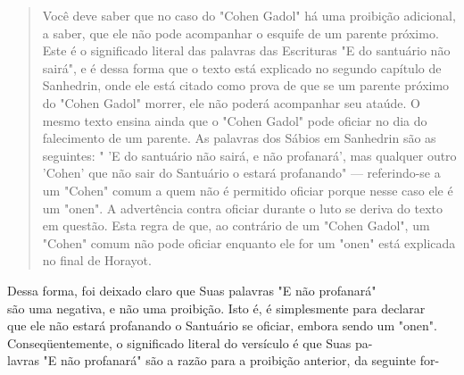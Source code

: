 \begin{quote}
Você deve saber que no caso do "Cohen Gadol" há uma proibição adicional,
a saber, que ele não pode acompanhar o esquife de um parente pró­ximo.
Este é o significado literal das palavras das Escrituras "E do santuário
não sairá", e é dessa forma que o texto está explicado no segundo
capítulo de Sa­nhedrin, onde ele está citado como prova de que se um
parente próximo do "Cohen Gadol" morrer, ele não poderá acompanhar seu
ataúde. O mesmo tex­to ensina ainda que o "Cohen Gadol" pode oficiar no
dia do falecimento de um parente. As palavras dos Sábios em Sanhedrin
são as seguintes: " 'E do san­tuário não sairá, e não profanará', mas
qualquer outro 'Cohen' que não sair do Santuário o estará profanando"
--- referindo-se a um "Cohen" comum a quem não é permitido oficiar
porque nesse caso ele é um "onen". A advertência con­tra oficiar durante
o luto se deriva do texto em questão. Esta regra de que, ao contrário de
um "Cohen Gadol", um "Cohen" comum não pode oficiar en­quanto ele for um
"onen" está explicada no final de Horayot.
\end{quote}

Dessa forma, foi deixado claro que Suas palavras "E não profanará"\\
são uma negativa, e não uma proibição. Isto é, é simplesmente para
declarar\\
que ele não estará profanando o Santuário se oficiar, embora sendo um
"onen".\\
Conseqüentemente, o significado literal do versículo é que Suas pa-\\
lavras "E não profanará" são a razão para a proibição anterior, da
seguinte for-


